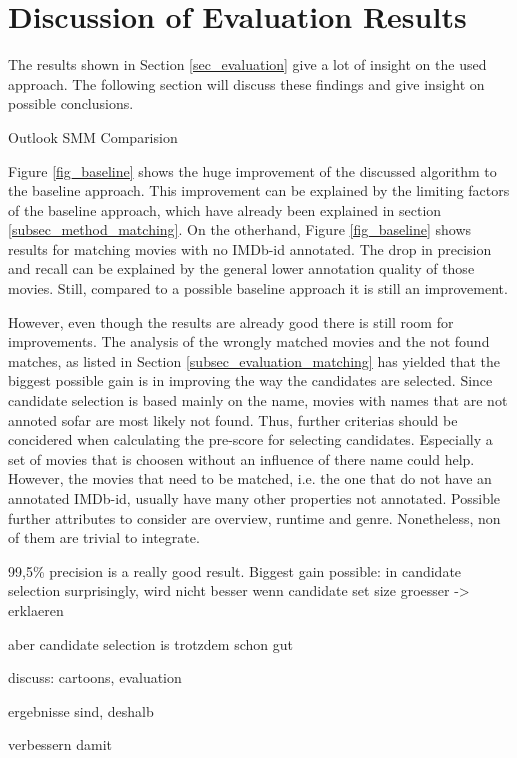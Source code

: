 \section{Discussion of Evaluation Results}
\label{sec_discussion}

The results shown in Section \ref{sec_evaluation} give a lot of insight on the used approach.
The following section will discuss these findings and give insight on possible conclusions.

Outlook SMM Comparision

Figure \ref{fig_baseline} shows the huge improvement of the discussed algorithm to the baseline approach.
This improvement can be explained by the limiting factors of the baseline approach, which have already been explained in section \ref{subsec_method_matching}.
On the otherhand, Figure \ref{fig_baseline} shows results for matching movies with no IMDb-id annotated.
The drop in precision and recall can be explained by the general lower annotation quality of those movies.
Still, compared to a possible baseline approach it is still an improvement.

However, even though the results are already good there is still room for improvements.
The analysis of the wrongly matched movies and the not found matches, as listed in Section \ref{subsec_evaluation_matching} has yielded that the biggest possible gain is in improving the way the candidates are selected.
Since candidate selection is based mainly on the name, movies with names that are not annoted sofar are most likely not found.
Thus, further criterias should be concidered when calculating the pre-score for selecting candidates.
Especially a set of movies that is choosen without an influence of there name could help.
However, the movies that need to be matched, i.e. the one that do not have an annotated IMDb-id, usually have many other properties not annotated.
Possible further attributes to consider are overview, runtime and genre.
Nonetheless, non of them are trivial to integrate.

99,5\% precision is a really good result.
Biggest gain possible: in candidate selection
surprisingly, wird nicht besser wenn candidate set size groesser -> erklaeren

aber candidate selection is trotzdem schon gut

discuss: cartoons, evaluation

ergebnisse sind, deshalb

verbessern damit

